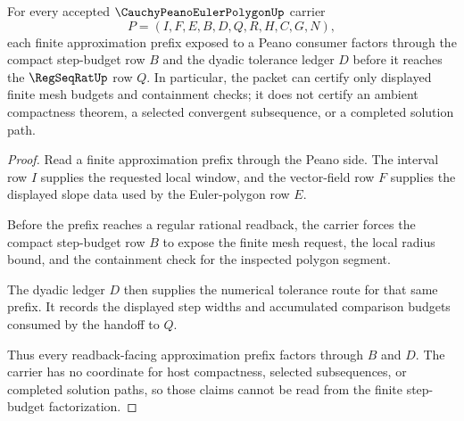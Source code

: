 \begin{theorem}
\label{thm:cauchy-peano-euler-polygon-compact-step-budget}
For every accepted $\CauchyPeanoEulerPolygonUp$ carrier
$$
P=(I,F,E,B,D,Q,R,H,C,G,N),
$$
each finite approximation prefix exposed to a Peano consumer factors through the compact step-budget row $B$ and the dyadic tolerance ledger $D$ before it reaches the $\RegSeqRatUp$ row $Q$. In particular, the packet can certify only displayed finite mesh budgets and containment checks; it does not certify an ambient compactness theorem, a selected convergent subsequence, or a completed solution path.
\end{theorem}
\begin{proof}
Read a finite approximation prefix through the Peano side. The interval row $I$ supplies the requested local window, and the vector-field row $F$ supplies the displayed slope data used by the Euler-polygon row $E$.

Before the prefix reaches a regular rational readback, the carrier forces the compact step-budget row $B$ to expose the finite mesh request, the local radius bound, and the containment check for the inspected polygon segment.

The dyadic ledger $D$ then supplies the numerical tolerance route for that same prefix. It records the displayed step widths and accumulated comparison budgets consumed by the handoff to $Q$.

Thus every readback-facing approximation prefix factors through $B$ and $D$. The carrier has no coordinate for host compactness, selected subsequences, or completed solution paths, so those claims cannot be read from the finite step-budget factorization.
\end{proof}

